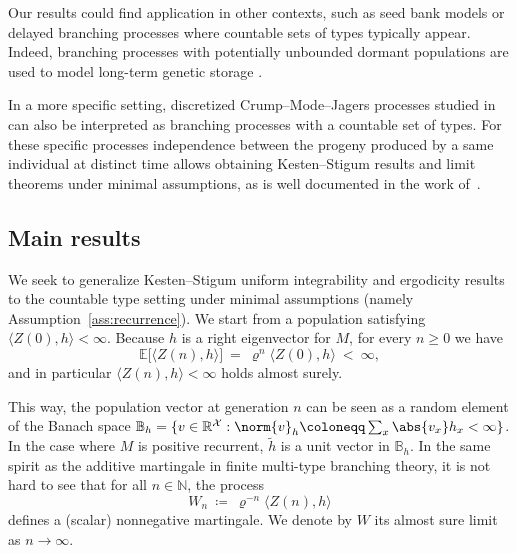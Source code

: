 \begin{refsegment}
Our results could find application in other contexts, such as seed bank models or delayed branching processes where countable sets of types typically appear.
Indeed, branching processes with potentially unbounded dormant populations are used to model long-term genetic storage \citep{Casanova_Kurt_Spanò_2013}. 

In a more specific setting, discretized Crump--Mode--Jagers processes studied in~\cite{jagers_general_2008} can also be interpreted as branching processes with a countable set of types.
For these specific processes independence between the progeny produced by a same individual at distinct time allows obtaining Kesten--Stigum results and limit theorems under minimal assumptions, as is well documented in the work of~\cite{nerman_convergence_1981}.



\subsection*{Main results}
We seek to generalize Kesten--Stigum uniform integrability and ergodicity results to the countable type setting under minimal assumptions (namely Assumption~\ref{ass:recurrence}).
We start from a population satisfying $\langle Z(0), h\rangle <\infty$.
Because $h$ is a right eigenvector for $M$, for every $n\geq 0$ we have 
\[
\mathbb{E}\big[\langle Z(n), h\rangle \big]\ =\ \varrho^n \langle Z(0), h\rangle\ <\ \infty,
\]
 and in particular $\langle Z(n), h\rangle<\infty$ holds almost surely.

This way, the population vector at generation $n$ can be seen as a random element of the Banach space $\mathbb{B}_h=\{v\in \mathbb{R}^{\mathcal{X}} : \norm{v}_{h} \coloneqq \sum_x \abs{v_x}h_x < \infty\}$. In the case where $M$ is positive recurrent, $\tilde{h}$ is a unit vector in $\mathbb{B}_h$. In the same spirit as the additive martingale in finite multi-type branching theory, it is not hard to see that for all $n\in \mathbb{N}$, the process  
\begin{equation*}
W_n\ \coloneqq\ \varrho^{-n}\langle Z(n), h\rangle
\end{equation*}
defines a (scalar) nonnegative martingale. We denote by $W$ its almost sure limit as $n\to\infty$. 


\end{refsegment}
